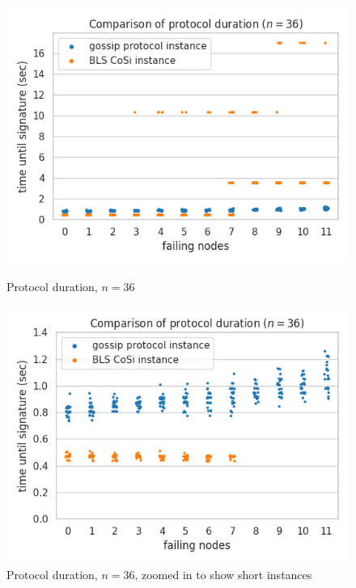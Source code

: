 \begin{figure}[H]
    \centering
    \begin{minipage}{0.5\textwidth}
        \centering
        \includegraphics[width=\textwidth]{figures/1/round_wall_sum_36.png}
        \captionsetup{labelformat=empty}
        \caption{Protocol duration, $n = 36$}
    \end{minipage}\hfill
    \begin{minipage}{0.5\textwidth}
        \centering
        \includegraphics[width=\textwidth]{figures/1/round_wall_sum_zoomed_36.png}
        \captionsetup{labelformat=empty}
        \caption{Protocol duration, $n = 36$, zoomed in to show short instances}
    \end{minipage}\hfill
\end{figure}

